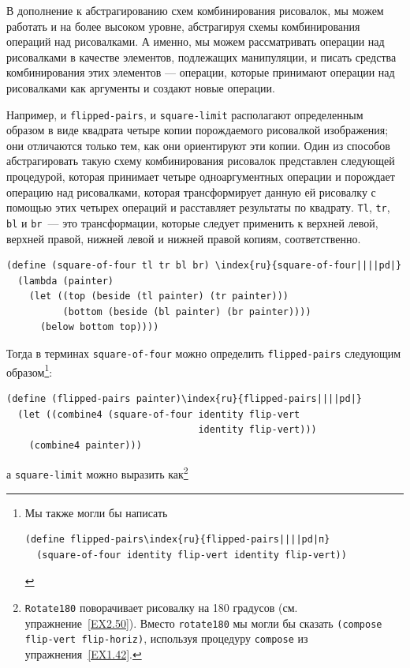 В дополнение к абстрагированию схем комбинирования
рисовалок, мы можем работать и на более высоком уровне, абстрагируя
схемы комбинирования операций над рисовалками. А именно, мы можем
рассматривать операции над рисовалками в качестве элементов, подлежащих
манипуляции, и писать средства комбинирования этих элементов ---
операции, которые принимают операции над рисовалками как аргументы и
создают новые операции.

Например, и {\tt flipped-pairs}, и
{\tt square-limit} располагают определенным образом в виде
квадрата четыре копии порождаемого рисовалкой изображения; они
отличаются только тем, как они ориентируют эти копии. Один из способов 
абстрагировать такую схему комбинирования рисовалок представлен
следующей процедурой, которая принимает четыре одноаргументных
операции и порождает операцию над рисовалками, которая трансформирует
данную ей рисовалку с помощью этих четырех операций и расставляет
результаты по квадрату. {\tt Tl}, {\tt tr},
{\tt bl} и {\tt br}~--- это трансформации, которые
следует применить к верхней левой, верхней правой, нижней левой и
нижней правой копиям, соответственно.

\begin{Verbatim}[fontsize=\small]
(define (square-of-four tl tr bl br) \index{ru}{square-of-four||||pd|}
  (lambda (painter)
    (let ((top (beside (tl painter) (tr painter)))
          (bottom (beside (bl painter) (br painter))))
      (below bottom top))))
\end{Verbatim}


Тогда в терминах {\tt square-of-four} можно определить
{\tt flipped-pairs} следующим образом\footnote{Мы также могли бы написать

\begin{Verbatim}[fontsize=\footnotesize]
(define flipped-pairs\index{ru}{flipped-pairs||||pd|п}
  (square-of-four identity flip-vert identity flip-vert))
\end{Verbatim}
}:%
\begin{Verbatim}[fontsize=\small]
(define (flipped-pairs painter)\index{ru}{flipped-pairs||||pd|}
  (let ((combine4 (square-of-four identity flip-vert
                                  identity flip-vert)))
    (combine4 painter)))
\end{Verbatim}
а {\tt square-limit} можно выразить как\footnote{{\tt Rotate180} поворачивает рисовалку на 180
градусов (см. упражнение~\ref{EX2.50}).  Вместо
{\tt rotate180} мы могли бы сказать {\tt (compose flip-vert
flip-horiz)}, используя процедуру {\tt compose} из
упражнения~\ref{EX1.42}.}

